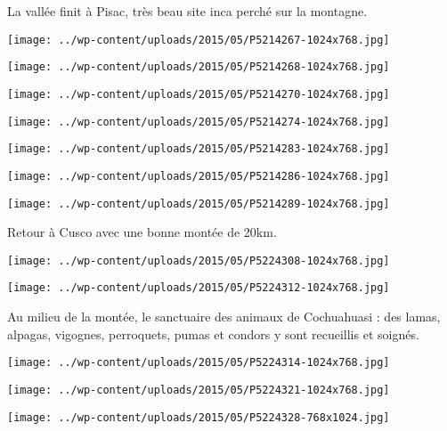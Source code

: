 La vallée finit à Pisac, très beau site inca perché sur la montagne. 
\begin{center} \texttt{[image: ../wp-content/uploads/2015/05/P5214267-1024x768.jpg]} \end{center}
\begin{center} \texttt{[image: ../wp-content/uploads/2015/05/P5214268-1024x768.jpg]} \end{center}
\begin{center} \texttt{[image: ../wp-content/uploads/2015/05/P5214270-1024x768.jpg]} \end{center}
\begin{center} \texttt{[image: ../wp-content/uploads/2015/05/P5214274-1024x768.jpg]} \end{center}
\begin{center} \texttt{[image: ../wp-content/uploads/2015/05/P5214283-1024x768.jpg]} \end{center}
\begin{center} \texttt{[image: ../wp-content/uploads/2015/05/P5214286-1024x768.jpg]} \end{center}
\begin{center} \texttt{[image: ../wp-content/uploads/2015/05/P5214289-1024x768.jpg]} \end{center}

Retour à Cusco avec une bonne montée de 20km. 
\begin{center} \texttt{[image: ../wp-content/uploads/2015/05/P5224308-1024x768.jpg]} \end{center}
\begin{center} \texttt{[image: ../wp-content/uploads/2015/05/P5224312-1024x768.jpg]} \end{center}

Au milieu de la montée, le sanctuaire des animaux de Cochuahuasi : des lamas, alpagas, vigognes, perroquets, pumas et condors y sont recueillis et soignés. 
\begin{center} \texttt{[image: ../wp-content/uploads/2015/05/P5224314-1024x768.jpg]} \end{center}
\begin{center} \texttt{[image: ../wp-content/uploads/2015/05/P5224321-1024x768.jpg]} \end{center}
\begin{center} \texttt{[image: ../wp-content/uploads/2015/05/P5224328-768x1024.jpg]} \end{center}
